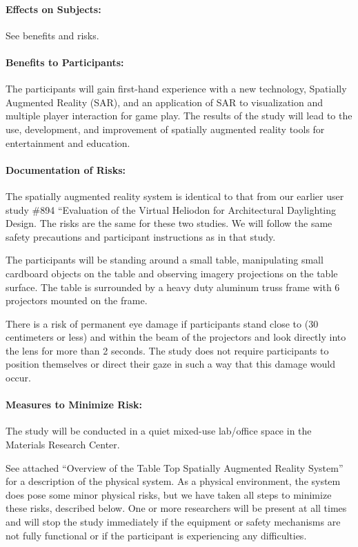 \documentclass[10pt]{article}
\begin{document}
\paragraph{Effects on Subjects:}
%
See benefits and risks.

\paragraph{Benefits to Participants:}
The participants will gain first-hand experience with a new
technology, Spatially Augmented Reality (SAR), and an application of
SAR to visualization and multiple player interaction for game play.
The results of the study will lead to the use, development, and
improvement of spatially augmented reality tools for entertainment and
education.

\paragraph{Documentation of Risks:}   
The spatially augmented reality system is identical to that from our
earlier user study \#894 “Evaluation of the Virtual Heliodon for
Architectural Daylighting Design.  The risks are the same for these
two studies.  We will follow the same safety precautions and
participant instructions as in that study.

The participants will be standing around a small table, manipulating
small cardboard objects on the table and observing imagery projections
on the table surface.  The table is surrounded by a heavy duty
aluminum truss frame with 6 projectors mounted on the frame.

There is a risk of permanent eye damage if participants stand close
to (30 centimeters or less) and within the beam of the projectors and
look directly into the lens for more than 2 seconds.  The study does
not require participants to position themselves or direct their gaze
in such a way that this damage would occur.

\paragraph{Measures to Minimize Risk:}
\vspace{0.1in}
\noindent
The study will be conducted in a quiet mixed-use lab/office space in
the Materials Research Center.

See attached ``Overview of the Table Top Spatially Augmented Reality
System'' for a description of the physical system.  As a physical
environment, the system does pose some minor physical risks, but we
have taken all steps to minimize these risks, described below.  One or
more researchers will be present at all times and will stop the study
immediately if the equipment or safety mechanisms are not fully
functional or if the participant is experiencing any difficulties.
\end{document}
